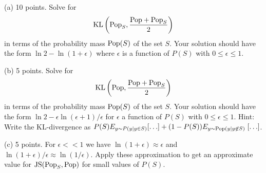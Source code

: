 \documentclass{article}
\newcommand{\solution}[1]{}
\begin{document}
{\medskip
(a) 10 points. Solve for
$$\mathrm{KL}\left(\mathrm{Pop}_S,\frac{\mathrm{Pop}+\mathrm{Pop}_S}{2}\right)$$
in terms of the probability mass $\mathrm{Pop}(S)$ of the set $S$.  Your solution should have the form
$\ln 2 - \ln (1 + \epsilon)$ where $\epsilon$ is a function of $P(S)$ with $0 \leq \epsilon \leq 1$.

\solution{
  \begin{eqnarray*}
    \mathrm{KL}\left(\pop_S,\frac{\pop+\pop_S}{2}\right) & = & E_{y \sim \pop_S}\;\ln \frac{2\pop_S(y)}{\pop(y) + \pop_S(y)} \\
    \\
    & = & E_{y \sim \pop_S}\;\ln \frac{\frac{2\pop(y)}{\pop(S)}}{\pop(y) + \frac{\pop(y)}{\pop(S)}} \\
    \\
    & = & \ln \frac{2}{\pop(S) + 1} \\
    \\
    & = & \ln 2 - \ln (1 + P(S)) \\
  \end{eqnarray*}
}

(b) 5 points. Solve for
$$\mathrm{KL}\left(\mathrm{Pop},\frac{\mathrm{Pop}+\mathrm{Pop}_S}{2}\right)$$
in terms of the probability mass $\mathrm{Pop}(S)$ of the set $S$.  Your solution should have the form $\ln 2 - \epsilon \ln (\epsilon + 1)/\epsilon$
for $\epsilon$ a function of  $P(S)$ with $0 \leq \epsilon \leq 1$.
Hint: Write the KL-divergence as $P(S)E_{y \sim P(y|y\in S)} [\ldots] + (1-P(S))E_{y \sim \mathrm{Pop}(y|y \not \in S)}\;[\ldots]$.

\solution{
  \begin{eqnarray*}
    & & \mathrm{KL}\left(\pop,\frac{\pop+\pop_S}{2}\right) \\
    \\
    & = & E_{y \sim \pop}\;\ln \frac{2\pop(y)}{\pop(y) + \pop_S(y)} \\
    \\
    & = & \pop(S)E_{y \sim \pop(y|y \in S)}\;\ln \frac{2\pop(y)}{\pop(y) + \frac{\pop(y)}{\pop(S)}}
    +(1-\pop(S))E_{y \sim \pop(y|y \not \in S)} \ln \frac{2\pop(y)}{\pop(y)} \\
    \\
    & = & \pop(S)\;\ln \frac{2\pop(S)}{\pop(S)+1} + (1- \pop(S)) \ln 2 \\
    \\
    & = & \ln 2 - \pop(S)\;\ln \frac{\pop(S)+1}{\pop(S)} 
  \end{eqnarray*}
}

\medskip
(c) 5 points. For $\epsilon << 1$ we have $\ln(1+ \epsilon) \approx \epsilon$ and $\ln(1+ \epsilon)/\epsilon \approx \ln(1/\epsilon)$.  Apply these approximation
to get an approximate value for $\mathrm{JS}(\mathrm{Pop}_S,\mathrm{Pop})$ for small values of $P(S)$.

}
\end{document}
